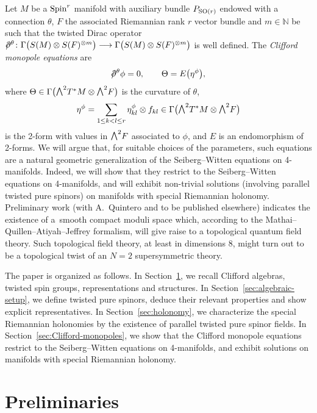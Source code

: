 \documentclass[pdftex]{sigma}
\newcommand{\ext}{\raise1pt\hbox{\small$\bigwedge$}}
\newcommand{\dirac}{/\kern-5pt\partial}
\newcommand{\lra}{\longrightarrow}
\numberwithin{equation}{section}
\begin{document}
Let $M$ be a ${\rm Spin}^r$ manifold with auxiliary bundle $P_{{\rm SO}(r)}$ endowed with a connection $\theta$, $F$ the associated Riemannian rank $r$ vector bundle
and $m\in\mathbb{N}$ be such that the twisted Dirac operator $\dirac^\theta\colon \Gamma\big(S(M)\otimes S(F)^{\otimes m}\big)\lra \Gamma\big(S(M)\otimes S(F)^{\otimes m}\big)$ is well defined. The {\em Clifford monopole equations} are
\begin{gather*}
 \dirac^\theta\phi = 0,\qquad
\Theta = E\big(\eta^\phi\big),
\end{gather*}
where
$ \Theta \in \Gamma\big(\ext^2T^*M\otimes\ext^2 F\big)$ is the curvature of $\theta$,
\begin{gather*}
 \eta^\phi = \sum_{1\leq k<l \leq r} \eta_{kl}^\phi\otimes f_{kl} \in \Gamma\big(\ext^2T^*M\otimes\ext^2 F\big)
\end{gather*}
is the 2-form with values in $\ext^2 F$ associated to $\phi$, and $E$ is an endomorphism of 2-forms. We will argue that, for suitable choices of the parameters, such equations
are a natural geometric generalization of the Seiberg--Witten equations on 4-manifolds. Indeed, we will show that they restrict to the Seiberg--Witten equations on 4-manifolds, and will exhibit non-trivial solutions (involving parallel twisted pure spinors) on manifolds with special Riemannian holonomy. Preliminary work (with A.~Quintero and to be published elsewhere) indicates the existence of a~smooth compact moduli space which, according to the Mathai--Quillen--Atiyah--Jeffrey for\-ma\-lism, will give raise to a topological quantum field theory. Such topological field theory, at least in dimensions $8$, might turn out to be a topological twist of an $N=2$ supersymmetric theory.


The paper is organized as follows. In Section~\ref{preliminaries}, we recall Clifford algebras, twisted spin groups, representations and structures. In Section~\ref{sec:algebraic-setup}, we define twisted pure spinors, deduce their relevant properties and show explicit representatives. In Section~\ref{sec:holonomy}, we characterize the special Riemannian holonomies by the existence of parallel twisted pure spinor fields. In Section~\ref{sec:Clifford-monopoles}, we show that the Clifford monopole equations restrict to the Seiberg--Witten equations on 4-manifolds, and exhibit solutions on manifolds with special Riemannian holonomy.

\section{Preliminaries}\label{preliminaries}
\end{document}
